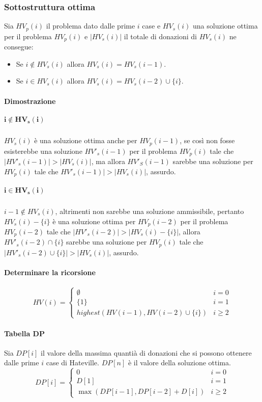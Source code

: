\subsubsection{Sottostruttura ottima}
Sia $HV_p(i)$ il problema dato dalle prime $i$ case e $HV_s(i)$ una soluzione ottima per il problema $HV_p(i)$ e $|HV_s(i)|$ il totale di donazioni di $HV_s(i)$ ne consegue:
\begin{itemize}
\item Se $i\not\in HV_s(i)$ allora $HV_s(i) = HV_s(i-1)$.
\item Se $i\in HV_s(i)$ allora $HV_s(i) = HV_s(i-2)\cup\{i\}$.
\end{itemize}
\paragraph{Dimostrazione}
\subparagraph{$\mathbf{i\not\in HV_s(i)}$}
$HV_s(i)$ \`e una soluzione ottima anche per $HV_p(i-1)$, se cos\`i non fosse esisterebbe una soluzione $HV'_s(i-1)$ per il problema $HV_p(i)$ tale che $|HV'_s(i-1)|>|HV_s(i)|$, ma allora $HV'_S(i-1)$ sarebbe 
una soluzione per $HV_p(i)$ tale che $HV'_s(i-1)|>|HV_s(i)|$, assurdo.
\subparagraph{$\mathbf{i\in HV_s(i)}$}
$i-1\not\in HV_s(i)$, altrimenti non sarebbe una soluzione ammissibile, pertanto $HV_s(i)-\{i\}$ \`e una soluzione ottima per $HV_p(i-2)$ per il problema $HV_p(i-2)$ tale che $|HV'_s(i-2)|>|HV_s(i)-\{i\}|$, allora
$HV'_s(i-2)\cap\{i\}$ sarebbe una soluzione per $HV_p(i)$ tale che $|HV'_s(i-2)\cup\{i\}|>|HV_s(i)|$, assurdo.
\paragraph{Determinare la ricorsione}
$$
HV(i)=
\begin{cases}
\emptyset\quad& i=0\\
\{1\} & i=1\\
highest(HV(i-1), HV(i-2)\cup\{i\}) & i\ge 2
\end{cases}
$$
\paragraph{Tabella DP}
Sia $DP[i]$ il valore della massima quanti\`a di donazioni che si possono ottenere dalle prime $i$ case di Hateville. $DP[n]$ \`e il valore della soluzione ottima.
$$
DP[i]=
\begin{cases}
0 \quad& i=0\\
D[1] & i=1\\
\max(DP[i-1], DP[i-2]+D[i]) & i\ge 2
\end{cases}
$$
